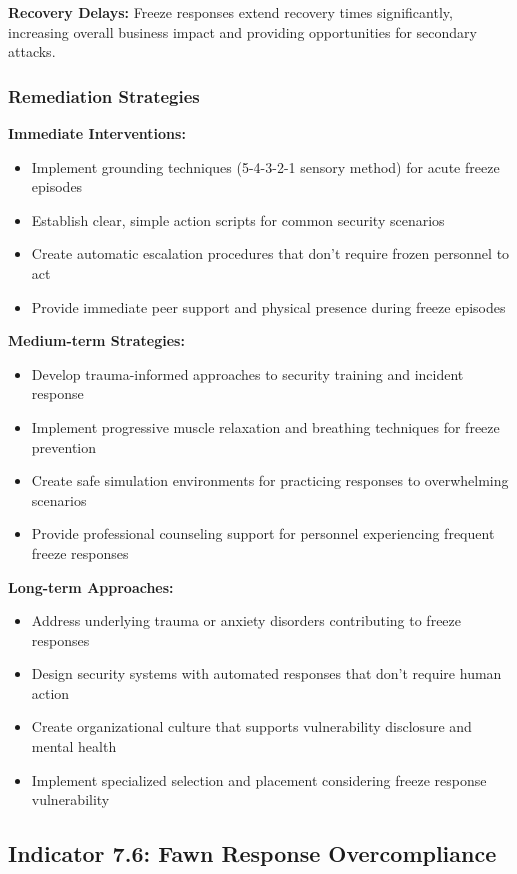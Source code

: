 \documentclass[11pt,a4paper]{article}
\begin{document}
\textbf{Recovery Delays:} Freeze responses extend recovery times significantly, increasing overall business impact and providing opportunities for secondary attacks\cite{recovery2023}.

\subsubsection{Remediation Strategies}

\textbf{Immediate Interventions:}
\begin{itemize}
\item Implement grounding techniques (5-4-3-2-1 sensory method) for acute freeze episodes
\item Establish clear, simple action scripts for common security scenarios
\item Create automatic escalation procedures that don't require frozen personnel to act
\item Provide immediate peer support and physical presence during freeze episodes
\end{itemize}

\textbf{Medium-term Strategies:}
\begin{itemize}
\item Develop trauma-informed approaches to security training and incident response
\item Implement progressive muscle relaxation and breathing techniques for freeze prevention
\item Create safe simulation environments for practicing responses to overwhelming scenarios
\item Provide professional counseling support for personnel experiencing frequent freeze responses
\end{itemize}

\textbf{Long-term Approaches:}
\begin{itemize}
\item Address underlying trauma or anxiety disorders contributing to freeze responses
\item Design security systems with automated responses that don't require human action
\item Create organizational culture that supports vulnerability disclosure and mental health
\item Implement specialized selection and placement considering freeze response vulnerability
\end{itemize}

\subsection{Indicator 7.6: Fawn Response Overcompliance}
\end{document}
